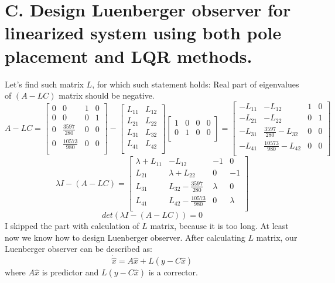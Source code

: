 \documentclass[a4paper,11pt]{article}
\theoremstyle{mytheor}
\begin{document}
\section*{C. Design Luenberger observer for linearized system using both pole placement and LQR methods.}
Let's find such matrix $L$, for which such statement holds: Real part of eigenvalues of $(A-LC)$ matrix should be negative.
\[
A-LC=
\begin{bmatrix}
0&0&1&0\\
0&0&0&1\\
0&\frac{3597}{280}&0&0\\
0&\frac{10573}{980}&0&0\\
\end{bmatrix}
-
\begin{bmatrix}
L_{11}&L_{12}\\
L_{21}&L_{22}\\
L_{31}&L_{32}\\
L_{41}&L_{42}\\
\end{bmatrix}
\begin{bmatrix}
1&0&0&0\\
0&1&0&0\\
\end{bmatrix}
=
\begin{bmatrix}
-L_{11}&-L_{12}&1&0\\
-L_{21}&-L_{22}&0&1\\
-L_{31}&\frac{3597}{280}-L_{32}&0&0\\
-L_{41}&\frac{10573}{980}-L_{42}&0&0\\
\end{bmatrix}
\]
\[
\lambda I-(A-LC)=
\begin{bmatrix}
\lambda+L_{11}&-L_{12}&-1&0\\
L_{21}&\lambda+L_{22}&0&-1\\
L_{31}&L_{32}-\frac{3597}{280}&\lambda&0\\
L_{41}&L_{42}-\frac{10573}{980}&0&\lambda\\
\end{bmatrix}
\]
\[
det(\lambda I-(A-LC))=0
\]
I skipped the part with calculation of $L$ matrix, because it is too long. At least now we know how to design Luenberger observer. After calculating $L$ matrix, our Luenberger observer can be described as:
\[
\dot{\hat{x}}=A\hat{x}+L(y-C\hat{x})
\]
where $A\hat{x}$ is predictor and $L(y-C\hat{x})$ is a corrector.
\end{document}
